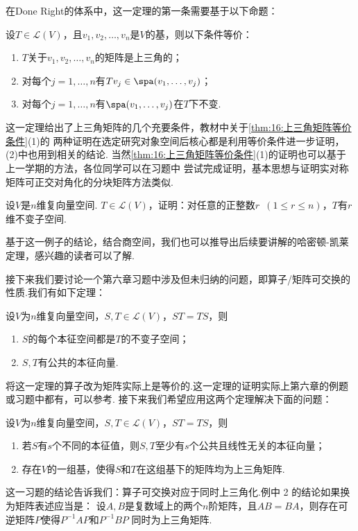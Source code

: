 在Done Right的体系中，这一定理的第一条需要基于以下命题：
\begin{theorem}
    设$T\in \mathcal{L}(V)$，且$v_1,v_2,\ldots,v_n$是$V$的基，则以下条件等价：
    \begin{enumerate}
        \item $T$关于$v_1,v_2,\ldots,v_n$的矩阵是上三角的；

        \item 对每个$j=1,\ldots,n$有$Tv_j\in\spa(v_1,\ldots,v_j)$；

        \item 对每个$j=1,\ldots,n$有$\spa(v_1,\ldots,v_j)$在$T$下不变.
    \end{enumerate}
\end{theorem}
这一定理给出了上三角矩阵的几个充要条件，教材中关于\autoref{thm:16:上三角矩阵等价条件}(1)的
两种证明在选定研究对象空间后核心都是利用等价条件进一步证明，(2)中也用到相关的结论.
当然\autoref{thm:16:上三角矩阵等价条件}(1)的证明也可以基于上一学期的方法，各位同学可以在习题中
尝试完成证明，基本思想与证明实对称矩阵可正交对角化的分块矩阵方法类似.
\begin{example}
    设$V$是$n$维复向量空间. $T\in \mathcal{L}(V)$，证明：对任意的正整数$r\enspace(1\leqslant r\leqslant n)$，$T$有$r$维不变子空间.
\end{example}
基于这一例子的结论，结合商空间，我们也可以推导出后续要讲解的哈密顿-凯莱定理，感兴趣的读者可以了解.

接下来我们要讨论一个第六章习题中涉及但未归纳的问题，即算子/矩阵可交换的性质.我们有如下定理：
\begin{theorem}
    设$V$为$n$维复向量空间，$S,T\in \mathcal{L}(V)$，$ST=TS$，则
    \begin{enumerate}
        \item $S$的每个本征空间都是$T$的不变子空间；

        \item $S,T$有公共的本征向量.
    \end{enumerate}
\end{theorem}
将这一定理的算子改为矩阵实际上是等价的.这一定理的证明实际上第六章的例题或习题中都有，可以参考.
接下来我们希望应用这两个定理解决下面的问题：
\begin{example}
    设$V$为$n$维复向量空间，$S,T\in \mathcal{L}(V)$，$ST=TS$，则
    \begin{enumerate}
        \item 若$S$有$s$个不同的本征值，则$S,T$至少有$s$个公共且线性无关的本征向量；

        \item 存在$V$的一组基，使得$S$和$T$在这组基下的矩阵均为上三角矩阵.
    \end{enumerate}
\end{example}
这一习题的结论告诉我们：算子可交换对应于同时上三角化.例中 2 的结论如果换为矩阵表述应当是：
设$A,B$是复数域上的两个$n$阶矩阵，且$AB=BA$，则存在可逆矩阵$P$使得$P^{-1}AP$和$P^{-1}BP$
同时为上三角矩阵.

